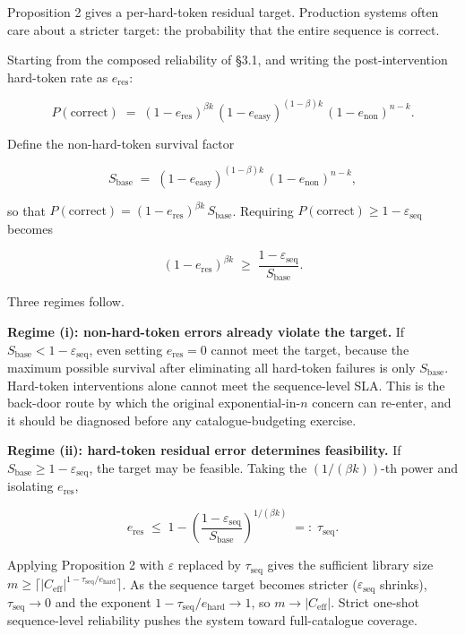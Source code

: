\documentclass[
]{article}
\begin{document}
Proposition 2 gives a per-hard-token residual target. Production systems
often care about a stricter target: the probability that the entire
sequence is correct.

Starting from the composed reliability of §3.1, and writing the
post-intervention hard-token rate as \(e_{\text{res}}\):

\[
P(\text{correct}) \;=\; (1 - e_{\text{res}})^{\beta k}\,(1 - e_{\text{easy}})^{(1 - \beta) k}\,(1 - e_{\text{non}})^{n - k}.
\]

Define the non-hard-token survival factor

\[
S_{\text{base}} \;=\; (1 - e_{\text{easy}})^{(1 - \beta) k}\,(1 - e_{\text{non}})^{n - k},
\]

so that
\(P(\text{correct}) = (1 - e_{\text{res}})^{\beta k}\, S_{\text{base}}\).
Requiring \(P(\text{correct}) \geq 1 - \varepsilon_{\text{seq}}\)
becomes

\[
(1 - e_{\text{res}})^{\beta k} \;\geq\; \frac{1 - \varepsilon_{\text{seq}}}{S_{\text{base}}}.
\]

Three regimes follow.

\textbf{Regime (i): non-hard-token errors already violate the target.}
If \(S_{\text{base}} < 1 - \varepsilon_{\text{seq}}\), even setting
\(e_{\text{res}} = 0\) cannot meet the target, because the maximum
possible survival after eliminating all hard-token failures is only
\(S_{\text{base}}\). Hard-token interventions alone cannot meet the
sequence-level SLA. This is the back-door route by which the original
exponential-in-\(n\) concern can re-enter, and it should be diagnosed
before any catalogue-budgeting exercise.

\textbf{Regime (ii): hard-token residual error determines feasibility.}
If \(S_{\text{base}} \geq 1 - \varepsilon_{\text{seq}}\), the target may
be feasible. Taking the \((1/(\beta k))\)-th power and isolating
\(e_{\text{res}}\),

\[
e_{\text{res}} \;\leq\; 1 - \left(\frac{1 - \varepsilon_{\text{seq}}}{S_{\text{base}}}\right)^{1 / (\beta k)}
\;=:\; \tau_{\text{seq}}.
\]

Applying Proposition 2 with \(\varepsilon\) replaced by
\(\tau_{\text{seq}}\) gives the sufficient library size
\(m \geq \lceil |C_{\text{eff}}|^{1 - \tau_{\text{seq}} / e_{\text{hard}}} \rceil\).
As the sequence target becomes stricter (\(\varepsilon_{\text{seq}}\)
shrinks), \(\tau_{\text{seq}} \to 0\) and the exponent
\(1 - \tau_{\text{seq}}/e_{\text{hard}} \to 1\), so
\(m \to |C_{\text{eff}}|\). Strict one-shot sequence-level reliability
pushes the system toward full-catalogue coverage.
\end{document}
